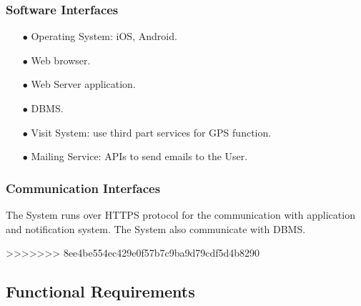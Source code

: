 \documentclass[a4paper, 12pt, oneside]{article}
\begin{document}
\subsubsection{Software Interfaces}
\begin{enumerate}
\item[$\bullet$] Operating System: iOS, Android.
\item[$\bullet$] Web browser.
\item[$\bullet$] Web Server application.
\item[$\bullet$] DBMS.
\item[$\bullet$] Visit System: use third part services for GPS function. 
\item[$\bullet$] Mailing Service: APIs to send emails to the User.
\end{enumerate}

\subsubsection{Communication Interfaces}
The System runs over HTTPS protocol for the communication with application and notification system. The System also communicate with DBMS.

>>>>>>> 8ee4be554ec429e0f57b7c9ba9d79cdf5d4b8290
\subsection{Functional Requirements}
\end{document}
